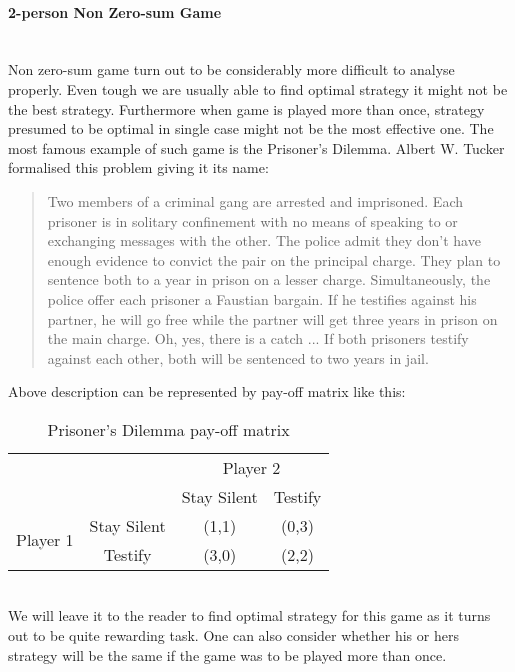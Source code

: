 \documentclass[10pt, a4paper]{report}
\begin{document}
\paragraph{2-person Non Zero-sum Game} ~\\
Non zero-sum game turn out to be considerably more difficult to analyse properly. Even tough we are usually able to find optimal strategy it might not be the best strategy. Furthermore when game is played more than once, strategy presumed to be optimal in single case might not be the most effective one. The most famous example of such game is the Prisoner's Dilemma. Albert W. Tucker formalised this problem giving it its name:
\begin{quotation}
    Two members of a criminal gang are arrested and imprisoned. Each prisoner is in solitary confinement with no means of speaking to or exchanging messages with the other. The police admit they don't have enough evidence to convict the pair on the principal charge. They plan to sentence both to a year in prison on a lesser charge. Simultaneously, the police offer each prisoner a Faustian bargain. If he testifies against his partner, he will go free while the partner will get three years in prison on the main charge. Oh, yes, there is a catch ... If both prisoners testify against each other, both will be sentenced to two years in jail.
\end{quotation}
Above description can be represented by pay-off matrix like this:
\begin{table}[ht!]
	\hspace{-2em}
	\centering
	\begin{tabular}{cccc|}
		& & \multicolumn{2}{c}{Player 2}                                              \\ \cline{3-4}
		& & Stay Silent &  \multicolumn{1}{c}{Testify}                                \\ \cline{3-4}
		\multirow{2}{*}{Player 1} & \multicolumn{1}{|c|}{Stay Silent} & (1,1) & (0,3) \\
		& \multicolumn{1}{|c|}{Testify} & (3,0) & (2,2)                               \\ \cline{3-4}
	\end{tabular}
	\caption{Prisoner's Dilemma pay-off matrix}
\end{table}
\\
We will leave it to the reader to find optimal strategy for this game as it turns out to be quite rewarding task. One can also consider whether his or hers strategy will be the same if the game was to be played more than once.
\end{document}
